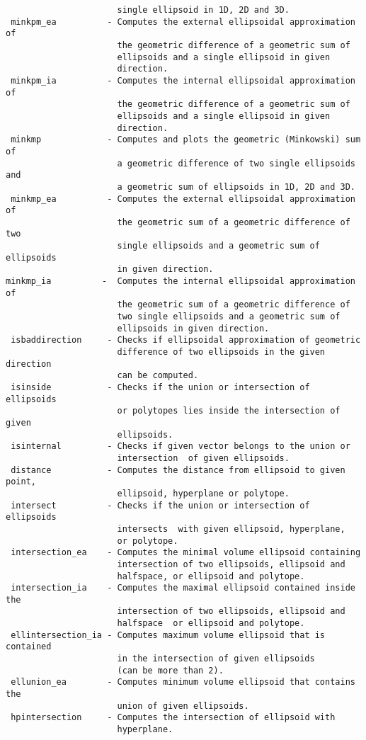 \begin{enumerate}
\begin{lstlisting}
                      single ellipsoid in 1D, 2D and 3D.
 minkpm_ea          - Computes the external ellipsoidal approximation of
                      the geometric difference of a geometric sum of
                      ellipsoids and a single ellipsoid in given
                      direction.
 minkpm_ia          - Computes the internal ellipsoidal approximation of
                      the geometric difference of a geometric sum of
                      ellipsoids and a single ellipsoid in given
                      direction.
 minkmp             - Computes and plots the geometric (Minkowski) sum of
                      a geometric difference of two single ellipsoids and
                      a geometric sum of ellipsoids in 1D, 2D and 3D.
 minkmp_ea          - Computes the external ellipsoidal approximation of
                      the geometric sum of a geometric difference of two
                      single ellipsoids and a geometric sum of ellipsoids
                      in given direction.
minkmp_ia          -  Computes the internal ellipsoidal approximation of
                      the geometric sum of a geometric difference of
                      two single ellipsoids and a geometric sum of
                      ellipsoids in given direction.
 isbaddirection     - Checks if ellipsoidal approximation of geometric
                      difference of two ellipsoids in the given direction
                      can be computed.
 isinside           - Checks if the union or intersection of ellipsoids
                      or polytopes lies inside the intersection of given
                      ellipsoids.
 isinternal         - Checks if given vector belongs to the union or
                      intersection  of given ellipsoids.
 distance           - Computes the distance from ellipsoid to given point,
                      ellipsoid, hyperplane or polytope.
 intersect          - Checks if the union or intersection of ellipsoids
                      intersects  with given ellipsoid, hyperplane,
                      or polytope.
 intersection_ea    - Computes the minimal volume ellipsoid containing
                      intersection of two ellipsoids, ellipsoid and
                      halfspace, or ellipsoid and polytope.
 intersection_ia    - Computes the maximal ellipsoid contained inside the
                      intersection of two ellipsoids, ellipsoid and
                      halfspace  or ellipsoid and polytope.
 ellintersection_ia - Computes maximum volume ellipsoid that is contained
                      in the intersection of given ellipsoids
                      (can be more than 2).
 ellunion_ea        - Computes minimum volume ellipsoid that contains the
                      union of given ellipsoids.
 hpintersection     - Computes the intersection of ellipsoid with
                      hyperplane.




\end{lstlisting}
\end{enumerate}
